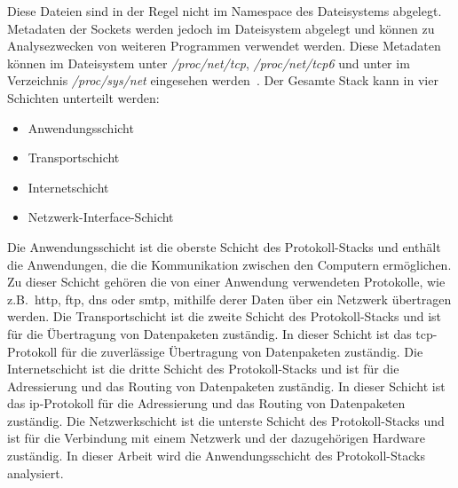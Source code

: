 Diese Dateien sind in der Regel nicht im Namespace des Dateisystems abgelegt.
Metadaten der Sockets werden jedoch im Dateisystem abgelegt und können zu Analysezwecken von weiteren Programmen verwendet werden.
Diese Metadaten können im Dateisystem unter \textit{/proc/net/tcp}, \textit{/proc/net/tcp6} und unter im Verzeichnis
\textit{/proc/sys/net} eingesehen werden~\cite{tcp-manpage}.\newline
Der Gesamte Stack kann in vier Schichten unterteilt werden:
\begin{itemize}
    \item Anwendungsschicht
    \item Transportschicht
    \item Internetschicht
    \item Netzwerk-Interface-Schicht
\end{itemize}
Die Anwendungsschicht ist die oberste Schicht des Protokoll-Stacks und enthält die Anwendungen,
die die Kommunikation zwischen den Computern ermöglichen.
Zu dieser Schicht gehören die von einer Anwendung verwendeten Protokolle, wie z.B.\ \gls{http}, \gls{ftp}, \gls{dns} oder \gls{smtp},
mithilfe derer Daten über ein Netzwerk übertragen werden.
Die Transportschicht ist die zweite Schicht des Protokoll-Stacks und ist für die Übertragung von Datenpaketen zuständig.
In dieser Schicht ist das \gls{tcp}-Protokoll für die zuverlässige Übertragung von Datenpaketen zuständig.
Die Internetschicht ist die dritte Schicht des Protokoll-Stacks und ist für die Adressierung und das Routing von Datenpaketen zuständig.
In dieser Schicht ist das \gls{ip}-Protokoll für die Adressierung und das Routing von Datenpaketen zuständig.
Die Netzwerkschicht ist die unterste Schicht des Protokoll-Stacks und ist für die Verbindung mit einem Netzwerk und der
dazugehörigen Hardware zuständig.\newline
In dieser Arbeit wird die Anwendungsschicht des Protokoll-Stacks analysiert.